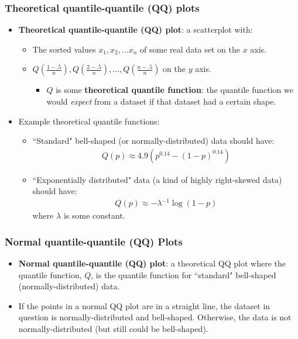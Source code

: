 \documentclass{beamer}
\providecommand{\nv}{{}^{-1}}
\numberwithin{equation}{section}
\begin{document}
\begin{frame}
\frametitle{Theoretical quantile-quantile (QQ) plots}

\begin{itemize}
\item {\bf Theoretical quantile-quantile (QQ) plot}: a scatterplot with:
\begin{itemize}
\pause \item The sorted values $x_1, x_2, \ldots x_n$ of some real data set on the $x$ axis.
\pause \item $Q(\frac{1 - .5}{n}), Q(\frac{2 - .5}{n}), \ldots, Q(\frac{n - .5}{n})$ on the $y$ axis.
\begin{itemize}
\pause \item $Q$ is some {\bf theoretical quantile function}: the quantile function we would \emph{expect} from a dataset if that dataset had a certain shape.
\end{itemize}
\end{itemize}

\pause \item Example theoretical quantile functions:
\begin{itemize}
\pause \item ``Standard" bell-shaped (or normally-distributed) data should have:
\begin{align*}
Q(p) \approx 4.9(p^{0.14} - (1 - p)^{0.14})
\end{align*}
\pause \item ``Exponentially distributed" data (a kind of highly right-skewed data) should have:
\begin{align*}
Q(p) \approx - \lambda \nv \log(1-p)
\end{align*}
where $\lambda$ is some constant.
\end{itemize}
\end{itemize}
\end{frame}

\begin{frame}
\frametitle{Normal quantile-quantile (QQ) Plots}
\begin{itemize}
\item {\bf Normal quantile-quantile (QQ) plot}: a theoretical QQ plot where the quantile function, $Q$, is the quantile function for ``standard" bell-shaped (normally-distributed) data.
\pause \item If the points in a normal QQ plot are in a straight line, the dataset in question is normally-distributed and bell-shaped. Otherwise, the data is not normally-distributed (but still could be bell-shaped).
\end{itemize}
\end{frame}
\end{document}
